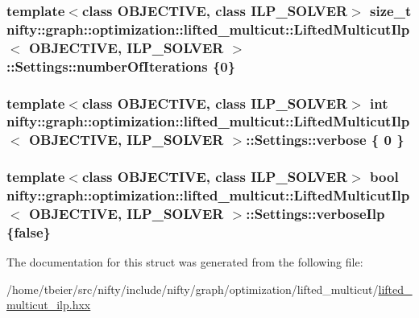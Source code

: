 \subsubsection[{number\+Of\+Iterations}]{\setlength{\rightskip}{0pt plus 5cm}template$<$class O\+B\+J\+E\+C\+T\+I\+V\+E, class I\+L\+P\+\_\+\+S\+O\+L\+V\+E\+R$>$ size\+\_\+t {\bf nifty\+::graph\+::optimization\+::lifted\+\_\+multicut\+::\+Lifted\+Multicut\+Ilp}$<$ O\+B\+J\+E\+C\+T\+I\+V\+E, I\+L\+P\+\_\+\+S\+O\+L\+V\+E\+R $>$\+::Settings\+::number\+Of\+Iterations \{0\}}\label{structnifty_1_1graph_1_1optimization_1_1lifted__multicut_1_1LiftedMulticutIlp_1_1Settings_ab411ff1a77aa2083662529bb75b888eb}
\hypertarget{structnifty_1_1graph_1_1optimization_1_1lifted__multicut_1_1LiftedMulticutIlp_1_1Settings_a5de34f6d14b797846f34471e70a346d5}{}
\subsubsection[{verbose}]{\setlength{\rightskip}{0pt plus 5cm}template$<$class O\+B\+J\+E\+C\+T\+I\+V\+E, class I\+L\+P\+\_\+\+S\+O\+L\+V\+E\+R$>$ int {\bf nifty\+::graph\+::optimization\+::lifted\+\_\+multicut\+::\+Lifted\+Multicut\+Ilp}$<$ O\+B\+J\+E\+C\+T\+I\+V\+E, I\+L\+P\+\_\+\+S\+O\+L\+V\+E\+R $>$\+::Settings\+::verbose \{ 0 \}}\label{structnifty_1_1graph_1_1optimization_1_1lifted__multicut_1_1LiftedMulticutIlp_1_1Settings_a5de34f6d14b797846f34471e70a346d5}
\hypertarget{structnifty_1_1graph_1_1optimization_1_1lifted__multicut_1_1LiftedMulticutIlp_1_1Settings_a03ae80e2892fc373176225518086f1a9}{}
\subsubsection[{verbose\+Ilp}]{\setlength{\rightskip}{0pt plus 5cm}template$<$class O\+B\+J\+E\+C\+T\+I\+V\+E, class I\+L\+P\+\_\+\+S\+O\+L\+V\+E\+R$>$ bool {\bf nifty\+::graph\+::optimization\+::lifted\+\_\+multicut\+::\+Lifted\+Multicut\+Ilp}$<$ O\+B\+J\+E\+C\+T\+I\+V\+E, I\+L\+P\+\_\+\+S\+O\+L\+V\+E\+R $>$\+::Settings\+::verbose\+Ilp \{false\}}\label{structnifty_1_1graph_1_1optimization_1_1lifted__multicut_1_1LiftedMulticutIlp_1_1Settings_a03ae80e2892fc373176225518086f1a9}


The documentation for this struct was generated from the following file\+:\begin{DoxyCompactItemize}
\item 
/home/tbeier/src/nifty/include/nifty/graph/optimization/lifted\+\_\+multicut/\hyperlink{lifted__multicut__ilp_8hxx}{lifted\+\_\+multicut\+\_\+ilp.\+hxx}\end{DoxyCompactItemize}
